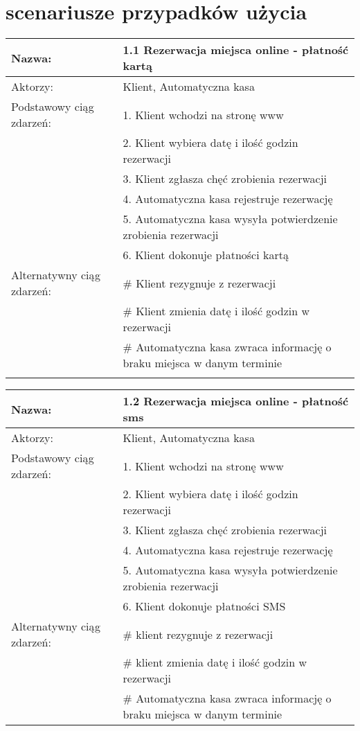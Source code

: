 \section{scenariusze przypadków użycia}
\begin{center}
\begin{tabular}{|L{3cm}  L{13cm}|}
\hline
Nazwa: & 1.1 Rezerwacja miejsca online - płatność kartą \\ \hline
Aktorzy: & Klient,  Automatyczna kasa \\ \hline
Podstawowy ciąg zdarzeń: & 1. Klient wchodzi na stronę www \\
 & 2. Klient wybiera datę i ilość godzin rezerwacji \\
 & 3. Klient zgłasza chęć zrobienia rezerwacji \\
 & 4. Automatyczna kasa rejestruje rezerwację \\
 & 5. Automatyczna kasa wysyła potwierdzenie zrobienia rezerwacji \\
 & 6. Klient dokonuje płatności kartą \\ \hline
Alternatywny ciąg zdarzeń:  & \# Klient rezygnuje z rezerwacji \\
 & \# Klient zmienia datę i ilość godzin w rezerwacji \\
 & \# Automatyczna kasa zwraca informację o braku miejsca w danym terminie\\
 \\ \hline
\end{tabular}

\vspace{1cm}

\begin{tabular}{|L{3cm}  L{13cm}|}
\hline
Nazwa: & 1.2 Rezerwacja miejsca online - płatność sms \\ \hline
Aktorzy: & Klient,  Automatyczna kasa \\ \hline
Podstawowy ciąg zdarzeń: & 1. Klient wchodzi na stronę www \\
 & 2. Klient wybiera datę i ilość godzin rezerwacji \\
 & 3. Klient zgłasza chęć zrobienia rezerwacji \\
 & 4. Automatyczna kasa rejestruje rezerwację \\
 & 5. Automatyczna kasa wysyła potwierdzenie zrobienia rezerwacji \\
 & 6. Klient dokonuje płatności SMS \\ \hline
Alternatywny ciąg zdarzeń:  & \# klient rezygnuje z rezerwacji \\
 & \# klient zmienia datę i ilość godzin w rezerwacji \\
 & \# Automatyczna kasa zwraca informację o braku miejsca w danym terminie\\ \hline
\end{tabular}


\end{center}
